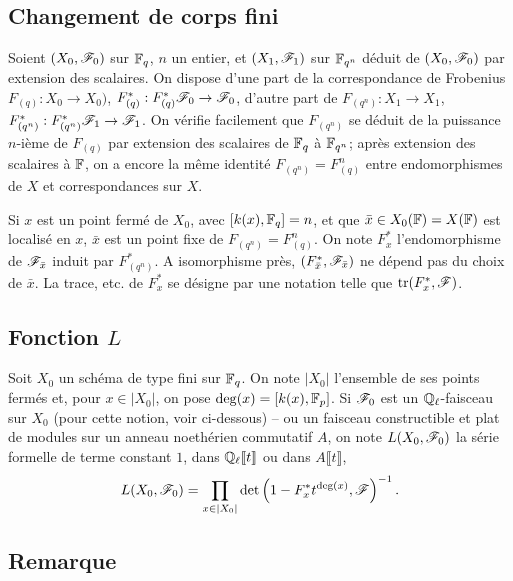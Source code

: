 \documentclass[oneside]{book}
\begin{document}
\subsection{Changement de corps fini}\label{II:1-5}

Soient $(X_0,\mathscr{F}_0)$ sur $\mathbb{F}_q$, $n$ un entier, et $(X_1,\mathscr{F}_1)$ sur 
$\mathbb{F}_{q^n}$ déduit de $(X_0,\mathscr{F}_0)$ par extension des scalaires. On dispose 
d'une part de la correspondance de Frobenius $F_{(q)}:X_0\to X_0)$, 
$F_{(q)}^*:F_{(q)}^*\mathscr{F}_0\to \mathscr{F}_0$, d'autre part de 
$F_{(q^n)}:X_1\to X_1$, $F_{(q^n)}^*:F_{(q^n)}^*\mathscr{F}_1\to\mathscr{F}_1$. On vérifie 
facilement que $F_{(q^n)}$ se déduit de la puissance $n$-ième de $F_{(q)}$ 
par extension des scalaires de $\mathbb{F}_q$ à $\mathbb{F}_{q^n}$; après extension des 
scalaires à $\mathbb{F}$, on a encore la même identité $F_{(q^n)}=F_{(q)}^n$ 
entre endomorphismes de $X$ et correspondances sur $X$. 

Si $x$ est un point fermé de $X_0$, avec $[k(x),\mathbb{F}_q]=n$, et que 
$\bar x\in X_0(\mathbb{F}) = X(\mathbb{F})$ est localisé en $x$, $\bar x$ est un point 
fixe de $F_{(q^n)}=F_{(q)}^n$. On note $F_x^*$ l'endomorphisme de 
$\mathscr{F}_{\bar x}$ induit par $F_{(q^n)}^*$. A isomorphisme près, 
$(F_{\bar x}^*,\mathscr{F}_{\bar x})$ ne dépend pas du choix de $\bar x$. La trace, 
etc. de $F_x^*$ se désigne par une notation telle que 
$\operatorname{tr}(F_x^*,\mathscr{F})$. 





\subsection{Fonction \texorpdfstring{$L$}{L}}\label{II:1-6}

Soit $X_0$ un schéma de type fini sur $\mathbb{F}_q$. On note $|X_0|$ l'ensemble de 
ses points fermés et, pour $x\in |X_0|$, on pose $\deg(x)=[k(x),\mathbb{F}_p]$. Si 
$\mathscr{F}_0$ est un $\mathbb{Q}_\ell$-faisceau sur $X_0$ (pour cette notion, voir 
ci-dessous) -- ou un faisceau constructible et plat de modules sur un 
anneau noethérien commutatif $A$, on note $L(X_0,\mathscr{F}_0)$ la série formelle 
de terme constant $1$, dans $\mathbb{Q}_\ell\llbracket t\rrbracket$ ou dans 
$A\llbracket t\rrbracket$, 
\[
  L(X_0,\mathscr{F}_0) = \prod_{x\in|X_0|} \det\left(1-F_x^* t^{\deg(x)},\mathscr{F}\right)^{-1} \text{.}
\]





\subsection{Remarque}\label{II:1-7}
\end{document}
